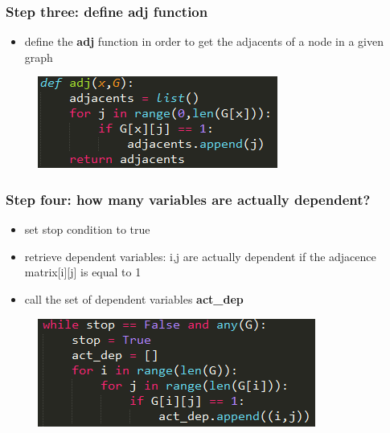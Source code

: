 \documentclass[xcolor ={table,usenames,dvipsnames}]{beamer}
\theoremstyle{definition}
\begin{document}
\begin{frame}
\frametitle{Step three: define adj function}
\begin{itemize}
	\item define the \textbf{adj} function in order to get the adjacents of a node in a given graph
\end{itemize}
	\begin{figure}[h!]
		\centering
		\includegraphics[scale=0.5]{img/adj.PNG}
	\end{figure}

\end{frame}
\begin{frame}
\frametitle{Step four: how many variables are actually dependent?}
\begin{itemize}
	\item set stop condition to true
	\item retrieve dependent variables: i,j are actually dependent if the adjacence matrix[i][j] is equal to 1
	\item call the set of dependent variables \textbf{act\_dep}
\end{itemize}
	\begin{figure}[h!]
		\centering
		\includegraphics[scale=0.5]{img/depvar.PNG}
	\end{figure}

\end{frame}
\end{document}
